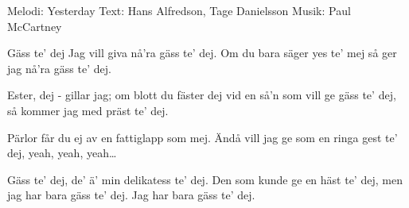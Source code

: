 \begin{song}


\begin{songmeta}
Melodi: Yesterday
Text: Hans Alfredson, Tage Danielsson
Musik: Paul McCartney
\end{songmeta}

\begin{songtext}
Gäss te' dej
Jag vill giva nå'ra gäss te' dej.
Om du bara säger yes te' mej
så ger jag nå'ra gäss te' dej.

Ester, dej -
gillar jag; om blott du fäster dej
vid en så'n som vill ge gäss te' dej,
så kommer jag med präst te' dej.

Pärlor får du ej av en fattiglapp som mej.
Ändå vill jag ge som en ringa gest te' dej,
yeah, yeah, yeah\ldots

Gäss te' dej,
de' ä' min delikatess te' dej.
Den som kunde ge en häst te' dej,
men jag har bara gäss te' dej.
Jag har bara gäss te' dej.
\end{songtext}

\end{song}
